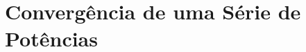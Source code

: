 \documentclass[fleqn,utf8,aspectratio=169,12pt]{beamer}
\begin{document}
\section{Convergência de uma Série de Potências}

%
%
%
%
%
%
%
%
\end{document}
